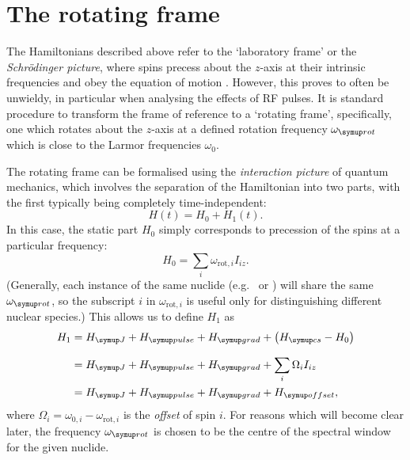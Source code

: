 \section{The rotating frame}
\label{sec:theory__rotating_frame}

The Hamiltonians described above refer to the `laboratory frame' or the \textit{Schr\"odinger picture}, where spins precess about the $z$-axis at their intrinsic frequencies and obey the equation of motion .
However, this proves to often be unwieldy, in particular when analysing the effects of RF pulses.
It is standard procedure to transform the frame of reference to a `rotating frame', specifically, one which rotates about the $z$-axis at a defined rotation frequency $\omegarot$ which is close to the Larmor frequencies $\omega_0$.

The rotating frame can be formalised using the \textit{interaction picture} of quantum mechanics,\autocite{Sakurai2021} which involves the separation of the Hamiltonian into two parts, with the first typically being completely time-independent:
\begin{equation}
    \label{eq:interaction_ham}
    H(t) = H_0 + H_1(t).
\end{equation}
In this case, the static part $H_0$ simply corresponds to precession of the spins at a particular frequency:
\begin{equation}
    \label{eq:interaction_ham0}
    H_0 = \sum_i \omega_{\text{rot},i}I_{iz}.
\end{equation}
(Generally, each instance of the same nuclide (e.g.\ \proton{} or \carbon{}) will share the same $\omegarot$, so the subscript $i$ in $\omega_{\text{rot},i}$ is useful only for distinguishing different nuclear species.)
This allows us to define $H_1$ as
\begin{align}
    \label{eq:reduced_ham}
    H_1 &= \HJ + \Hpulse + \Hgrad + \left(\Hcs - H_0\right) \\[7pt] \notag
        &= \HJ + \Hpulse + \Hgrad + \sum_i \Omega_i I_{iz} \\ \notag
        &= \HJ + \Hpulse + \Hgrad + \Hoffset,
\end{align}
where $\Omega_i = \omega_{0,i} - \omega_{\text{rot},i}$ is the \textit{offset} of spin $i$.
For reasons which will become clear later, the frequency $\omegarot$ is chosen to be the centre of the spectral window for the given nuclide.

